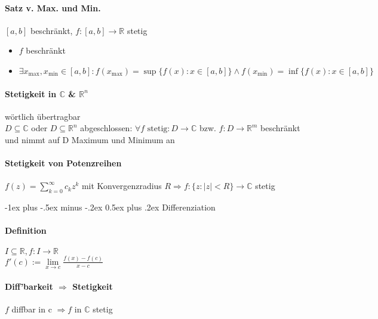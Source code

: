\documentclass[paper=a3,paper=landscape, fontsize=9pt, DIV=30]{scrartcl}
\makeatletter
\newcommand{\real}{{\mathbb{R}}}
\newcommand{\compl}{\mathbb{C}}
\renewcommand{\section}{\@startsection{section}{1}{0mm}%
  {-1ex plus -.5ex minus -.2ex}%
  {0.5ex plus .2ex}%
  {\color{blue}\normalfont\large\bfseries}}
\makeatother
\begin{document}
\begin{multicols*}{4}
  \paragraph{Satz v. Max. und Min.}
  $[a,b]$ beschränkt, $f: [a,b] \rightarrow \real$ stetig
  \begin{itemize}
  \item $f$ beschränkt
  \item $\exists x_{\max}, x_{\min} \in [a,b]: f(x_{\max})=\sup\{f(x): x \in [a,b]\} \wedge f(x_{\min})=\inf\{f(x):x \in [a,b]\}$
  \end{itemize}

  \paragraph{Stetigkeit in $\compl$ \& $\real ^n$} wörtlich übertragbar\\
  $D \subseteq \compl$ oder $D \subseteq \real^n$ abgeschlossen: $\forall f \text{ stetig}: D \rightarrow \compl$ bzw. $f: D \rightarrow \real^m$ beschränkt und nimmt auf D Maximum und Minimum an

  \paragraph{Stetigkeit von Potenzreihen}
  $ f(z)=\sum_{k=0}^{\infty} c_kz^k$ mit Konvergenzradius $R \Rightarrow f: \{z: \lvert z \rvert < R \} \rightarrow \compl$ stetig


  \section{Differenziation}

  \paragraph{Definition}
  $I \subseteq \real, f: I \rightarrow \real$\\
$f'(c) := \lim\limits_{x \rightarrow c} \frac{f(x)-f(c)}{x-c}$

  \paragraph{Diff'barkeit $\Rightarrow$ Stetigkeit}
  $f$ diffbar in c $\Rightarrow f$ in $\compl$ stetig


\end{multicols*}
\end{document}
